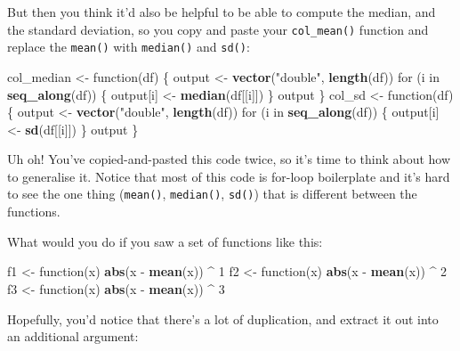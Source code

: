 \documentclass[]{book}
\newenvironment{Shaded}{\begin{snugshade}}{\end{snugshade}}
\newcommand{\KeywordTok}[1]{\textcolor[rgb]{0.13,0.29,0.53}{\textbf{{#1}}}}
\newcommand{\DecValTok}[1]{\textcolor[rgb]{0.00,0.00,0.81}{{#1}}}
\newcommand{\StringTok}[1]{\textcolor[rgb]{0.31,0.60,0.02}{{#1}}}
\newcommand{\NormalTok}[1]{{#1}}
\begin{document}
But then you think it'd also be helpful to be able to compute the
median, and the standard deviation, so you copy and paste your
\texttt{col\_mean()} function and replace the \texttt{mean()} with
\texttt{median()} and \texttt{sd()}:

\begin{Shaded}
\begin{Highlighting}[]
\NormalTok{col_median <-}\StringTok{ }\NormalTok{function(df) \{}
  \NormalTok{output <-}\StringTok{ }\KeywordTok{vector}\NormalTok{(}\StringTok{"double"}\NormalTok{, }\KeywordTok{length}\NormalTok{(df))}
  \NormalTok{for (i in }\KeywordTok{seq_along}\NormalTok{(df)) \{}
    \NormalTok{output[i] <-}\StringTok{ }\KeywordTok{median}\NormalTok{(df[[i]])}
  \NormalTok{\}}
  \NormalTok{output}
\NormalTok{\}}
\NormalTok{col_sd <-}\StringTok{ }\NormalTok{function(df) \{}
  \NormalTok{output <-}\StringTok{ }\KeywordTok{vector}\NormalTok{(}\StringTok{"double"}\NormalTok{, }\KeywordTok{length}\NormalTok{(df))}
  \NormalTok{for (i in }\KeywordTok{seq_along}\NormalTok{(df)) \{}
    \NormalTok{output[i] <-}\StringTok{ }\KeywordTok{sd}\NormalTok{(df[[i]])}
  \NormalTok{\}}
  \NormalTok{output}
\NormalTok{\}}
\end{Highlighting}
\end{Shaded}

Uh oh! You've copied-and-pasted this code twice, so it's time to think
about how to generalise it. Notice that most of this code is for-loop
boilerplate and it's hard to see the one thing (\texttt{mean()},
\texttt{median()}, \texttt{sd()}) that is different between the
functions.

What would you do if you saw a set of functions like this:

\begin{Shaded}
\begin{Highlighting}[]
\NormalTok{f1 <-}\StringTok{ }\NormalTok{function(x) }\KeywordTok{abs}\NormalTok{(x -}\StringTok{ }\KeywordTok{mean}\NormalTok{(x)) ^}\StringTok{ }\DecValTok{1}
\NormalTok{f2 <-}\StringTok{ }\NormalTok{function(x) }\KeywordTok{abs}\NormalTok{(x -}\StringTok{ }\KeywordTok{mean}\NormalTok{(x)) ^}\StringTok{ }\DecValTok{2}
\NormalTok{f3 <-}\StringTok{ }\NormalTok{function(x) }\KeywordTok{abs}\NormalTok{(x -}\StringTok{ }\KeywordTok{mean}\NormalTok{(x)) ^}\StringTok{ }\DecValTok{3}
\end{Highlighting}
\end{Shaded}

Hopefully, you'd notice that there's a lot of duplication, and extract
it out into an additional argument:
\end{document}
